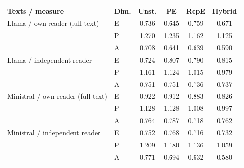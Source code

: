 \begin{tabular}{llcccc}
\toprule
Texts / measure & Dim. & Unst. & PE & RepE & Hybrid \\
\midrule
Llama / own reader (full text) & E & 0.736 & 0.645 & 0.759 & 0.671 \\
 & P & 1.270 & 1.235 & 1.162 & 1.125 \\
 & A & 0.708 & 0.641 & 0.639 & 0.590 \\
\midrule
Llama / independent reader & E & 0.724 & 0.807 & 0.790 & 0.815 \\
 & P & 1.161 & 1.124 & 1.015 & 0.979 \\
 & A & 0.751 & 0.751 & 0.736 & 0.737 \\
\midrule
Ministral / own reader (full text) & E & 0.922 & 0.912 & 0.883 & 0.826 \\
 & P & 1.128 & 1.128 & 1.008 & 0.997 \\
 & A & 0.764 & 0.787 & 0.718 & 0.762 \\
\midrule
Ministral / independent reader & E & 0.752 & 0.768 & 0.716 & 0.732 \\
 & P & 1.209 & 1.180 & 1.136 & 1.059 \\
 & A & 0.771 & 0.694 & 0.632 & 0.580 \\
\bottomrule
\end{tabular}
